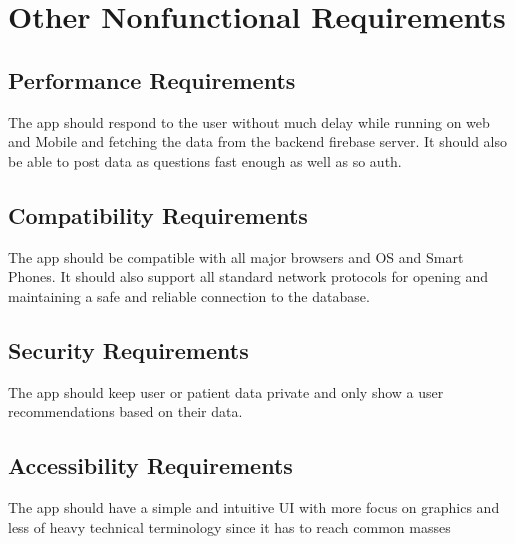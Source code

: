 \documentclass{article}
\begin{document}
\section{Other Nonfunctional Requirements}
\subsection{Performance Requirements}
The app should respond to the user without much delay while running on
web and Mobile and fetching the data from the backend firebase server.
It should also be able to post data as questions fast enough as well as
so auth.

\subsection{Compatibility Requirements}
The app should be compatible with all major browsers and OS and Smart
Phones. It should also support all standard network protocols for
opening and maintaining a safe and reliable connection to the database.

\subsection{Security Requirements}
The app should keep user or patient data private and only show a user
recommendations based on their data.

\subsection{Accessibility Requirements}
The app should have a simple and intuitive UI with more focus on
graphics and less of heavy technical terminology since it has to reach
common masses
\end{document}
